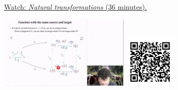 
\begin{minipage}{10cm}
    \href{https://act4e-spring21.netlify.app/videos/spring2021-nat-trafos:natural-trafos.html}{Watch: \emph{Natural transformations} (36 minutes).}
        
    \href{https://act4e-spring21.netlify.app/videos/spring2021-nat-trafos:natural-trafos.html}{\includegraphics[height=3.5cm]{spring2021-nat-trafos:natural-trafos/thumbnails.jpg}}
    \href{https://act4e-spring21.netlify.app/videos/spring2021-nat-trafos:natural-trafos.html}{\includegraphics[height=2.5cm]{spring2021-nat-trafos:natural-trafos/qrcode.png}}
\end{minipage}

